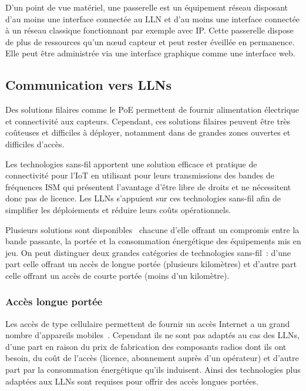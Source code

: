 D'un point de vue matériel, une passerelle est un équipement réseau disposant d'au moins une interface connectée au \ac{LLN} et d'au moins une interface connectée à un réseau classique fonctionnant par exemple avec IP.
Cette passerelle dispose de plus de ressources qu'un nœud capteur et peut rester éveillée en permanence.
Elle peut être administrée via une interface graphique comme une interface web.

\subsection{Communication vers \ac{LLN}s}
\label{gw:low_layers}

Des solutions filaires comme le \ac{PoE} permettent de fournir alimentation électrique et connectivité aux capteurs.
Cependant, ces solutions filaires peuvent être très coûteuses et difficiles à déployer, notamment dans de grandes zones ouvertes et difficiles d'accès.

Les technologies sans-fil apportent une solution efficace et pratique de connectivité pour l'\ac{IoT} en utilisant pour leurs transmissions des bandes de fréquences \ac{ISM} qui présentent l'avantage d'être libre de droits et ne nécessitent donc pas de licence.
Les \ac{LLN}s s'appuient sur ces technologies sans-fil afin de simplifier les déploiements et réduire leurs coûts opérationnels.

Plusieurs solutions sont disponibles~\cite{wifiCritic} chacune d'elle offrant un compromis entre la bande passante, la portée et la consommation énergétique des équipements mis en jeu.
On peut distinguer deux grandes catégories de technologies sans-fil~: d'une part celle offrant un accès de longue portée (plusieurs kilomètres) et d'autre part celle offrant un accès de courte portée (moins d'un kilomètre).

\subsubsection{Accès longue portée}
\label{gw:long_range}

Les accès de type cellulaire permettent de fournir un accès Internet a un grand nombre d'appareils mobiles~\cite{kim2007value}.
Cependant ils ne sont pas adaptés au cas des \ac{LLN}s, d'une part en raison du prix de fabrication des composants radios dont ils ont besoin, du coût de l'accès (licence, abonnement auprès d'un opérateur) et d'autre part par la consommation énergétique qu'ils induisent.
Ainsi des technologies plus adaptées aux \ac{LLN}s sont requises pour offrir des accès longues portées.

